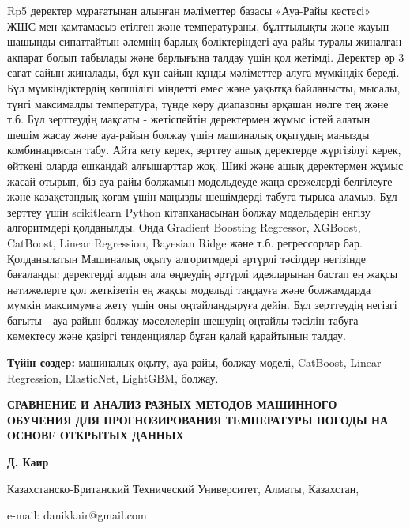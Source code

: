 Rp5 деректер мұрағатынан алынған мәліметтер базасы «Ауа-Райы кестесі»
ЖШС-мен қамтамасыз етілген және температураны, бұлттылықты және
жауын-шашынды сипаттайтын әлемнің барлық бөліктеріндегі ауа-райы туралы
жиналған ақпарат болып табылады және барлығына талдау үшін қол жетімді.
Деректер әр 3 сағат сайын жиналады, бұл күн сайын құнды мәліметтер алуға
мүмкіндік береді. Бұл мүмкіндіктердің көпшілігі міндетті емес және
уақытқа байланысты, мысалы, түнгі максималды температура, түнде көру
диапазоны әрқашан нөлге тең және т.б. Бұл зерттеудің мақсаты -
жетіспейтін деректермен жұмыс істей алатын шешім жасау және ауа-райын
болжау үшін машиналық оқытудың маңызды комбинациясын табу. Айта кету
керек, зерттеу ашық деректерде жүргізілуі керек, өйткені оларда ешқандай
алғышарттар жоқ. Шикі және ашық деректермен жұмыс жасай отырып, біз ауа
райы болжамын модельдеуде жаңа ережелерді белгілеуге және қазақстандық
қоғам үшін маңызды шешімдерді табуға тырыса аламыз. Бұл зерттеу үшін
scikitlearn Python кітапханасынан болжау модельдерін енгізу алгоритмдері
қолданылды. Онда Gradient Boosting Regressor, XGBoost, CatBoost, Linear
Regression, Bayesian Ridge және т.б. регрессорлар бар. Қолданылатын
Машиналық оқыту алгоритмдері әртүрлі тәсілдер негізінде бағаланды:
деректерді алдын ала өңдеудің әртүрлі идеяларынан бастап ең жақсы
нәтижелерге қол жеткізетін ең жақсы модельді таңдауға және болжамдарда
мүмкін максимумға жету үшін оны оңтайландыруға дейін. Бұл зерттеудің
негізгі бағыты - ауа-райын болжау мәселелерін шешудің оңтайлы тәсілін
табуға көмектесу және қазіргі тенденциялар бұған қалай қарайтынын
талдау.

{\bfseries Түйін сөздер:} машиналық оқыту, ауа-райы, болжау моделі,
CatBoost, Linear Regression, ElasticNet, LightGBM, болжау.

{\large\bfseries СРАВНЕНИЕ И АНАЛИЗ РАЗНЫХ МЕТОДОВ МАШИННОГО ОБУЧЕНИЯ ДЛЯ ПРОГНОЗИРОВАНИЯ ТЕМПЕРАТУРЫ ПОГОДЫ НА ОСНОВЕ ОТКРЫТЫХ ДАННЫХ}

{\bfseries Д. Каир}

Казахстанско-Британский Технический Университет, Алматы, Казахстан,

e-mail: danikkair@gmail.com

